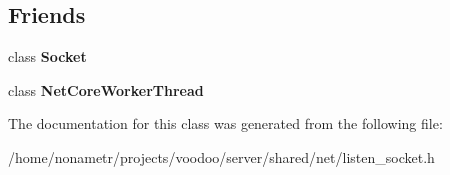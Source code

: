 \subsection*{\-Friends}
\begin{DoxyCompactItemize}
\item 
\hypertarget{classListenSocket_ab510887d735ee73ab1cb598c66260e87}{class {\bfseries \-Socket}}\label{classListenSocket_ab510887d735ee73ab1cb598c66260e87}

\item 
\hypertarget{classListenSocket_ae0585299ab7c2a563b1aeabf73ea2c21}{class {\bfseries \-Net\-Core\-Worker\-Thread}}\label{classListenSocket_ae0585299ab7c2a563b1aeabf73ea2c21}

\end{DoxyCompactItemize}


\-The documentation for this class was generated from the following file\-:\begin{DoxyCompactItemize}
\item 
/home/nonametr/projects/voodoo/server/shared/net/listen\-\_\-socket.\-h\end{DoxyCompactItemize}
